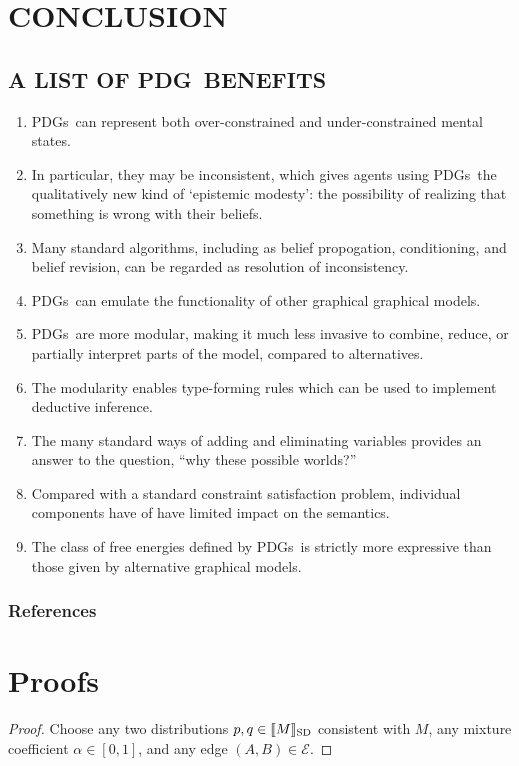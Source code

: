 \documentclass{article}
\newcommand\SD{_{\text{SD}}}
\newcommand{\Ed}{\mathcal E}
\newcommand{\MN}{PDG}
\newcommand{\MNs}{\MN s}
\numberwithin{equation}{section}
\begin{document}
\begin{notfocus}
	\section{CONCLUSION}
	\subsection{A LIST OF \MN\ BENEFITS}\label{sec:list-of-benefits}
	\begin{enumerate}[nosep]
		\item \MNs\ can represent both over-constrained and under-constrained mental states. 
		\item In particular, they may be inconsistent, which gives agents using \MNs\ the qualitatively new kind of `epistemic modesty': the possibility of realizing that something is wrong with their beliefs.
		\item Many standard algorithms, including as belief propogation, conditioning, and belief revision, can be regarded as resolution of inconsistency.
		\item \MNs\ can emulate the functionality of other graphical graphical models.
		\item \MNs\ are more modular, making it much less invasive to combine, reduce, or partially interpret parts of the model, compared to alternatives.
		\item The modularity enables type-forming rules which can be used to implement deductive inference.
		\item The many standard ways of adding and eliminating variables provides an answer to the question, ``why these possible worlds?''
		\item Compared with a standard constraint satisfaction problem, individual components have of have limited impact on the semantics.
		\item The class of free energies defined by \MNs\ is strictly more expressive than those given by alternative graphical models.
	\end{enumerate} %
	
	\subsubsection*{References}
	\printbibliography[heading=none]
	
	\onecolumn
	\appendix
	
	\section{Proofs}
	\thmsetconvex*
	\begin{proof}
		Choose any two distributions $p, q \in \bbr{M}\SD$ consistent with $M$, any mixture coefficient $\alpha \in [0,1]$, and any edge $(A,B) \in \Ed$.
		

\end{proof}
\end{notfocus}
\end{document}
